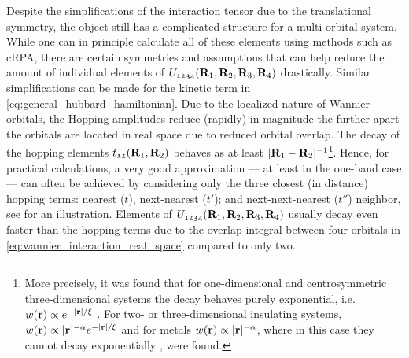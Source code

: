 \documentclass[../../main.tex]{subfiles}
\begin{document}
Despite the simplifications of the interaction tensor due to the translational symmetry, the object still has a complicated structure for a multi-orbital system. While one can in principle calculate all of these elements using methods such as cRPA, there are certain symmetries and assumptions that can help reduce the amount of individual elements of $U_{\mathfrak{1234}}(\textbf{R}_1,\textbf{R}_2,\textbf{R}_3,\textbf{R}_4)$ drastically. Similar simplifications can be made for the kinetic term in \eqref{eq:general_hubbard_hamiltonian}. Due to the localized nature of Wannier orbitals, the Hopping amplitudes reduce (rapidly) in magnitude the further apart the orbitals are located in real space due to reduced orbital overlap. The decay of the hopping elements $t_{\mathfrak{12}}(\textbf{R}_1,\textbf{R}_2)$ behaves as at least $|\textbf{R}_1-\textbf{R}_2|^{-1}$\footnote{More precisely, it was found that for one-dimensional and centrosymmetric three-dimensional systems the decay behaves purely exponential, i.e.\ $w(\textbf{r})\propto e^{-|\textbf{r}|/\xi}$ \cite{Cloizeaux1964}. For two- or three-dimensional insulating systems, $w(\textbf{r})\propto |\textbf{r}|^{-\alpha} e^{-|\textbf{r}|/\xi}$ \cite{He2001} and for metals $w(\textbf{r})\propto |\textbf{r}|^{-\alpha}$, where in this case they cannot decay exponentially \cite{Cornean2019}, were found.}. Hence, for practical calculations, a very good approximation --- at least in the one-band case --- can often be achieved by considering only the three closest (in distance) hopping terms: nearest ($t$), next-nearest ($t'$); and next-next-nearest ($t''$) neighbor, see  for an illustration. Elements of $U_{\mathfrak{1234}}(\textbf{R}_1,\textbf{R}_2,\textbf{R}_3,\textbf{R}_4)$ usually decay even faster than the hopping terms due to the overlap integral between four orbitals in \eqref{eq:wannier_interaction_real_space} compared to only two. 
\newline
\end{document}
